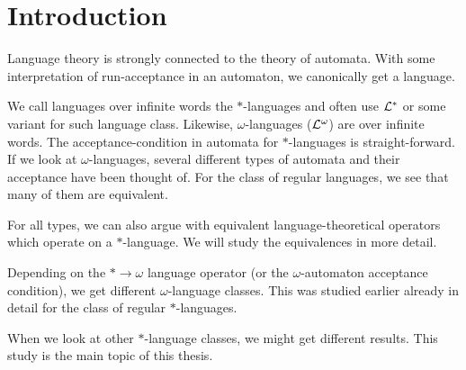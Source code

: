 
\section{Introduction}

Language theory is strongly connected to the theory of automata. With some interpretation of run-acceptance in an automaton, we canonically get a language.

We call languages over infinite words the $*$-languages and often use $\mathcal{L}^*$ or some variant for such language class. Likewise, $\omega$-languages ($\mathcal{L}^\omega$) are over infinite words. The acceptance-condition in automata for $*$-languages is straight-forward. If we look at $\omega$-languages, several different types of automata and their acceptance have been thought of. For the class of regular languages, we see that many of them are equivalent.

For all types, we can also argue with equivalent language-theoretical operators which operate on a $*$-language. We will study the equivalences in more detail.

Depending on the $* \rightarrow \omega$ language operator (or the $\omega$-automaton acceptance condition), we get different $\omega$-language classes. This was studied earlier already in detail for the class of regular $*$-languages.

When we look at other $*$-language classes, we might get different results. This study is the main topic of this thesis.
